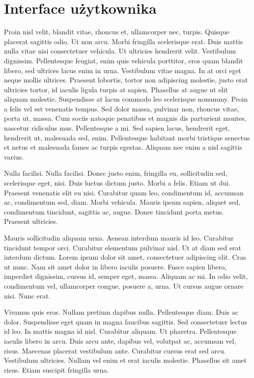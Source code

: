 \documentclass[eng,printmode]{mgr}
\begin{document}
\section{Interface użytkownika}
Proin nisl velit, blandit vitae, rhoncus et, ullamcorper nec, turpis. Quisque placerat sagittis odio. Ut non arcu. Morbi fringilla scelerisque erat. Duis mattis nulla vitae nisi consectetuer vehicula. Ut ultricies hendrerit velit. Vestibulum dignissim. Pellentesque feugiat, enim quis vehicula porttitor, eros quam blandit libero, sed ultrices lacus enim in urna. Vestibulum vitae magna. In at orci eget neque mollis ultrices. Praesent lobortis, tortor non adipiscing molestie, justo erat ultricies tortor, id iaculis ligula turpis at sapien. Phasellus at augue ut elit aliquam molestie. Suspendisse at lacus commodo leo scelerisque nonummy. Proin a felis vel est venenatis tempus. Sed dolor massa, pulvinar non, rhoncus vitae, porta ut, massa. Cum sociis natoque penatibus et magnis dis parturient montes, nascetur ridiculus mus. Pellentesque a mi. Sed sapien lacus, hendrerit eget, hendrerit ut, malesuada sed, enim. Pellentesque habitant morbi tristique senectus et netus et malesuada fames ac turpis egestas. Aliquam nec enim a nisl sagittis varius.

Nulla facilisi. Nulla facilisi. Donec justo enim, fringilla eu, sollicitudin sed, scelerisque eget, nisi. Duis luctus dictum justo. Morbi a felis. Etiam ut dui. Praesent venenatis elit eu nisi. Curabitur quam leo, condimentum id, accumsan ac, condimentum sed, diam. Morbi vehicula. Mauris ipsum sapien, aliquet sed, condimentum tincidunt, sagittis ac, augue. Donec tincidunt porta metus. Praesent ultricies.

Mauris sollicitudin aliquam urna. Aenean interdum mauris id leo. Curabitur tincidunt tempor orci. Curabitur elementum pulvinar nisl. Ut at diam sed erat interdum dictum. Lorem ipsum dolor sit amet, consectetuer adipiscing elit. Cras ut nunc. Nam sit amet dolor in libero iaculis posuere. Fusce sapien libero, imperdiet dignissim, cursus id, semper eget, massa. Aliquam ac mi. In odio velit, condimentum vel, ullamcorper congue, posuere a, urna. Ut cursus augue ornare nisi. Nunc erat.

Vivamus quis eros. Nullam pretium dapibus nulla. Pellentesque diam. Duis ac dolor. Suspendisse eget quam in magna faucibus sagittis. Sed consectetuer lectus id leo. In mattis magna id nisl. Curabitur aliquam. Ut pharetra. Pellentesque iaculis libero in arcu. Duis arcu ante, dapibus vel, volutpat ac, accumsan vel, risus. Maecenas placerat vestibulum ante. Curabitur cursus erat sed arcu. Vestibulum ultricies. Nullam vel enim et erat iaculis molestie. Phasellus sit amet risus. Etiam suscipit fringilla urna.
\end{document}

